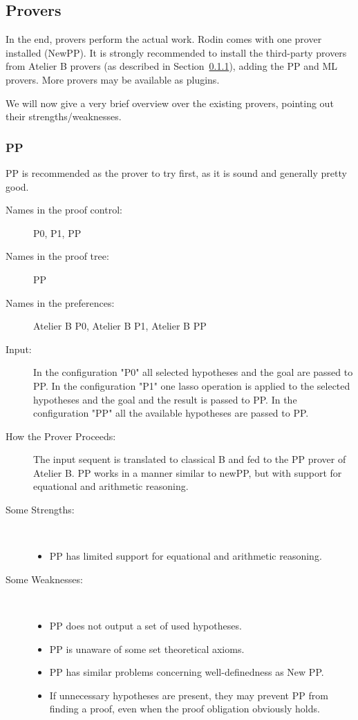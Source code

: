 \subsection{Provers}
\label{atelier_b_provers}

In the end, provers perform the actual work.  Rodin comes with one prover installed (NewPP).  It is strongly recommended to install the third-party provers from Atelier B provers (as described in Section~\ref{}), adding the PP and ML provers.  More provers may be available as plugins.

We will now give a very brief overview over the existing provers, pointing out their strengths/weaknesses.

\subsubsection{PP}

PP is recommended as the prover to try first, as it is sound and generally pretty good.

\begin{description}
	\item[Names in the proof control:]  P0, P1, PP
	\item[Names in the proof tree:] PP
	\item[Names in the preferences:] Atelier B P0, Atelier B P1, Atelier B PP
	\item[Input:] In the configuration "P0" all selected hypotheses and the goal are passed to PP. In the configuration "P1" one lasso operation is applied to the selected hypotheses and the goal and the result is passed to PP. In the configuration "PP" all the available hypotheses are passed to PP.
	\item[How the Prover Proceeds:] The input sequent is translated to classical B and fed to the PP prover of Atelier B. PP works in a manner similar to newPP, but with support for equational and arithmetic reasoning.
	\item[Some Strengths:] ~
	\begin{itemize}
		\item PP has limited support for equational and arithmetic reasoning. 
	\end{itemize}
	\item[Some Weaknesses:] ~
\begin{itemize}
	\item PP does not output a set of used hypotheses.
	\item PP is unaware of some set theoretical axioms.
	\item PP has similar problems concerning well-definedness as New PP.
	\item If unnecessary hypotheses are present, they may prevent PP from finding a proof, even when the proof obligation obviously holds. 
\end{itemize}
\end{description}

